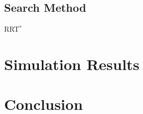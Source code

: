 \documentclass[conference]{IEEEtran}
\begin{document}

\subsection{Search Method}
RRT$^*$






\section{Simulation Results}

\section{Conclusion}
\end{document}
